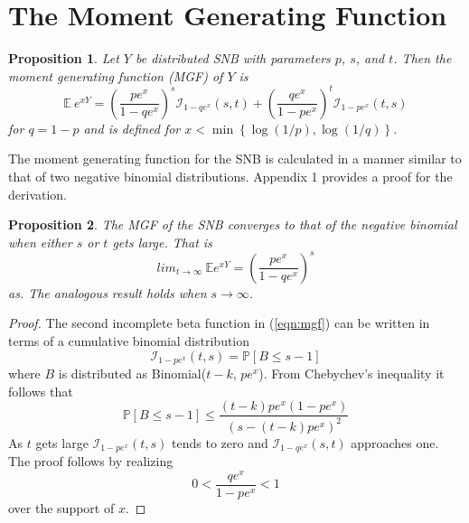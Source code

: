 \documentclass[sii]{ipart}
\newtheorem{prop}{Proposition}
\begin{document}
\section{The Moment Generating Function} \label{sect:mgf}

\begin{prop} Let $Y$ be distributed SNB with parameters $p$, $s$, and $t$.
Then the moment generating function (MGF) of $Y$ is
\begin{equation} \label{eqn:mgf}
\mathbb{E}~e^{xY} = \left(\frac{p e^x}{1 - qe^x}\right)^s 
  \mathcal{I}_{1-qe^x} (s, t) + \left(\frac{qe^x}{1-pe^x}\right)^t 
  \mathcal{I}_{1-pe^x}(t, s)
\end{equation}
for $q = 1-p$ and is defined for 
$x < \min \left\{\log(1/p), \log(1/q) \right\}$.
\end{prop}
The moment generating function for the SNB is calculated in a manner similar to 
that of two negative binomial distributions. Appendix 1 provides a proof for the derivation.

\begin{prop}
The MGF of the SNB converges to that of the negative binomial when either
$s$ or $t$ gets large. That is
\begin{equation*}
lim_{t\to\infty} \ \mathbb{E} e^{xY} = \left( \frac{pe^x}{1-qe^x} \right)^s
\end{equation*}
as. The analogous result holds when $s \rightarrow \infty$.
\end{prop}
\begin{proof}
The second incomplete beta function in (\ref{eqn:mgf}) can be written
in terms of a cumulative binomial distribution
\begin{equation*}
\mathcal{I}_{1-pe^x}(t, s) = \mathbb{P}\left[ B \leq s-1 \right]
\end{equation*}
where $B$ is distributed as
Binomial($t-k$, $pe^x$). From Chebychev's inequality %
it follows that
\begin{equation} \label{eqn:hoeffding}
\mathbb{P}\left[ B \leq s-1 \right] \leq 
  \frac{ (t-k) pe^x (1-pe^x) }{ \left(s - (t-k)pe^x\right)^2 }
\end{equation}
As $t$ gets large $\mathcal{I}_{1-pe^x}(t, s)$ tends to zero
and $\mathcal{I}_{1-qe^x}(s, t)$ approaches 
one. The proof follows by realizing 
\begin{equation*}
0 < \frac{qe^x}{1-pe^x} < 1
\end{equation*}
over the support of $x$.
\end{proof}
\end{document}
